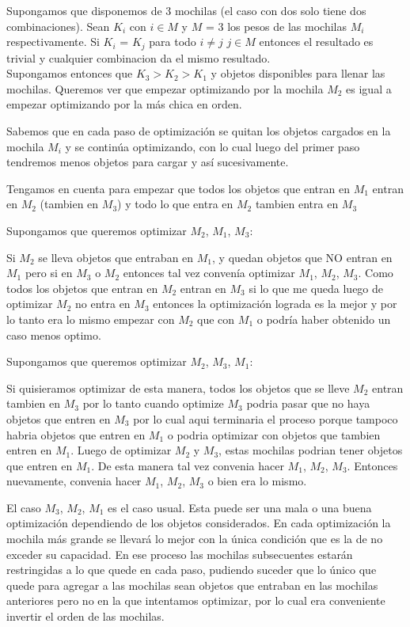 Supongamos que disponemos de 3 mochilas (el caso con dos solo tiene dos combinaciones). 
Sean $K_i$ con $i \in M$ y $M$ = 3 los pesos de las mochilas $M_i$ respectivamente. Si $K_i$ = $K_j$ para todo $i \neq j$ $j \in M$ entonces el resultado es trivial y cualquier combinacion da el mismo resultado. \\

Supongamos entonces que $K_3 > K_2 > K_1$ y objetos disponibles para llenar las mochilas. Queremos ver que empezar optimizando por la mochila $M_2$ es igual a empezar optimizando por la más chica en orden. 

Sabemos que en cada paso de optimización se quitan los objetos cargados en la mochila $M_i$ y se continúa optimizando, con lo cual luego del primer paso tendremos menos objetos para cargar y así sucesivamente.

Tengamos en cuenta para empezar que todos los objetos que entran en $M_1$ entran en $M_2$ (tambien en $M_3$) y todo lo que entra en $M_2$ tambien entra en $M_3$ 

Supongamos que queremos optimizar $M_2$, $M_1$, $M_3$:

Si $M_2$ se lleva objetos que entraban en $M_1$, y quedan objetos que NO entran en $M_1$ pero si en $M_3$ o $M_2$ entonces tal vez convenía optimizar $M_1$, $M_2$, $M_3$. Como todos los objetos que entran en $M_2$ entran en $M_3$ si lo que me queda luego de optimizar $M_2$ no entra en $M_3$ entonces la optimización lograda es la mejor y por lo tanto era lo mismo empezar con $M_2$ que con $M_1$ o podría haber obtenido un caso menos optimo.

Supongamos que queremos optimizar $M_2$, $M_3$, $M_1$: 

Si quisieramos optimizar de esta manera, todos los objetos que se lleve $M_2$ entran tambien en $M_3$ por lo tanto cuando optimize $M_3$ podria pasar que no haya objetos que entren en $M_3$ por lo cual aqui terminaria el proceso porque tampoco habria objetos que entren en $M_1$ o podria optimizar con objetos que tambien entren en $M_1$. Luego de optimizar $M_2$ y $M_3$, estas mochilas podrian tener objetos que entren en $M_1$. De esta manera tal vez convenia hacer $M_1$, $M_2$, $M_3$.
Entonces nuevamente, convenia hacer $M_1$, $M_2$, $M_3$ o bien era lo mismo. 

El caso $M_3$, $M_2$, $M_1$ es el caso usual. Esta puede ser una mala o una buena optimización dependiendo de los objetos considerados. En cada optimización la mochila más grande se llevará lo mejor con la única condición que es la de no exceder su capacidad. En ese proceso las mochilas subsecuentes estarán restringidas a lo que quede en cada paso, pudiendo suceder que lo único que quede para agregar a las mochilas sean objetos que entraban en las mochilas anteriores pero no en la que intentamos optimizar, por lo cual era conveniente invertir el orden de las mochilas. 


